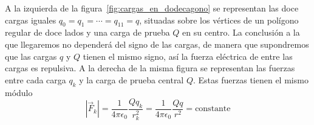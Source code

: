 \documentclass[a4paper,10pt]{article}
\begin{document}
\begin{soluc}
\item A la izquierda de la figura~\ref{fig:cargas_en_dodecagono} se representan
  las doce cargas iguales $q_{0} = q_{1} = \cdots = q_{11} = q$, situadas sobre
  los vértices de un polígono regular de doce lados y una carga de prueba $Q$
  en su centro.
  La conclusión a la que llegaremos no dependerá del signo de las cargas, de
  manera que supondremos que las cargas $q$ y $Q$ tienen el mismo signo,
  así la fuerza eléctrica de entre las cargas es repulsiva.
  A la derecha de la misma figura se representan las fuerzas entre cada carga
  $q_{k}$ y la carga de prueba central $Q$. Estas fuerzas tienen el mismo módulo
  \[
    |\vec{F}_{k}|
    = \dfrac{1}{4\pi\epsilon_{0}} \dfrac{Q q_{k}}{r_{k}^{2}}
    = \dfrac{1}{4\pi\epsilon_{0}} \dfrac{Q q}{r^{2}}
    = \text{constante}
  \]
  
  \begin{figure}[ht]
    \def\scl{1}
    \def\lado{2.5}
    \def\qsize{7.5pt}
    \def\Qsize{6.5pt}
    \centering
    \begin{minipage}{0.45\linewidth}
\end{minipage}
\hspace{2em}
\begin{minipage}{0.45\linewidth}
\end{minipage}
\end{figure}
\end{soluc}
\end{document}
